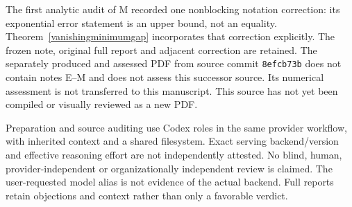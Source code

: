 \documentclass[11pt]{article}
\begin{document}
The first analytic audit of M recorded one nonblocking notation correction:
its exponential error statement is an upper bound, not an equality.
Theorem~\ref{vanishingminimumgap} incorporates that correction explicitly.
The frozen note, original full report and adjacent correction are retained.
The separately produced and assessed PDF from source commit \texttt{8efcb73b}
does not contain notes E--M and does not assess this successor source.
Its numerical assessment is not transferred to this manuscript. This source
has not yet been compiled or visually reviewed as a new PDF.

Preparation and source auditing use Codex roles in the same provider workflow, with inherited context and a shared filesystem. Exact serving backend/version and effective reasoning effort are not independently attested. No blind, human, provider-independent or organizationally independent review is claimed. The user-requested model alias is not evidence of the actual backend. Full reports retain objections and context rather than only a favorable verdict.
\end{document}
